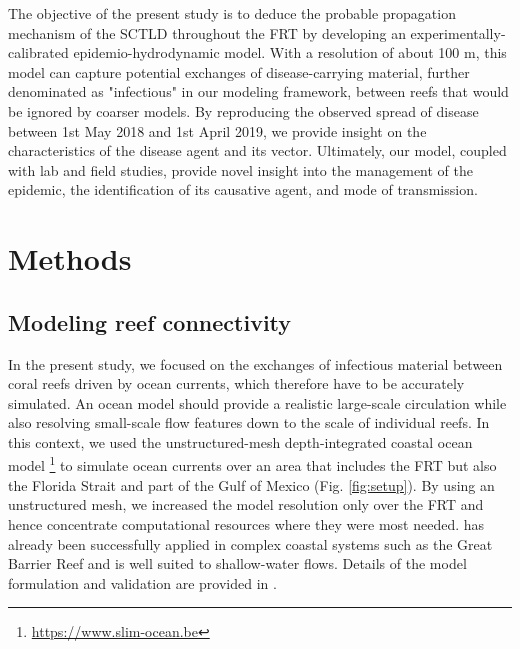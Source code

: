 The objective of the present study is to deduce the probable propagation mechanism of the SCTLD throughout the FRT by developing an experimentally-calibrated epidemio-hydrodynamic model. With a resolution of about 100 m, this model can capture potential exchanges of disease-carrying material, further denominated as "infectious" in our modeling framework, between reefs that would be ignored by coarser models. By reproducing the observed spread of disease between 1st May 2018 and 1st April 2019, we provide insight on the characteristics of the disease agent and its vector. Ultimately, our model, coupled with lab and field studies, provide novel insight into the management of the epidemic, the identification of its causative agent, and mode of transmission.

\section{Methods}

\subsection{Modeling reef connectivity}
In the present study, we focused on the exchanges of infectious material between coral reefs driven by ocean currents, which therefore have to be accurately simulated. An ocean model should provide a realistic large-scale circulation while also resolving small-scale flow features down to the scale of individual reefs. In this context, we used the unstructured-mesh depth-integrated coastal ocean model \slim\footnote{\url{https://www.slim-ocean.be}} to simulate ocean currents over an area that includes the FRT but also the Florida Strait and part of the Gulf of Mexico (Fig. \ref{fig:setup}). By using an unstructured mesh, we increased the model resolution only over the FRT and hence concentrate computational resources where they were most needed. \slim has already been successfully applied in complex coastal systems such as the Great Barrier Reef \citep{lambrechts2008multi, thomas2014numerical} and is well suited to shallow-water flows. Details of the model formulation and validation are provided in \cite{frys20}. 

